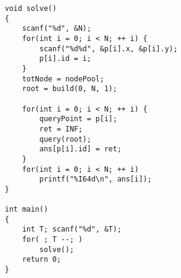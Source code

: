 \begin{lstlisting}
void solve()
{
    scanf("%d", &N);
    for(int i = 0; i < N; ++ i) {
        scanf("%d%d", &p[i].x, &p[i].y);
        p[i].id = i;
    }
    totNode = nodePool;
    root = build(0, N, 1);
    
    for(int i = 0; i < N; ++ i) {
        queryPoint = p[i];
        ret = INF;
        query(root);
        ans[p[i].id] = ret;
    }
    for(int i = 0; i < N; ++ i)
        printf("%I64d\n", ans[i]);
}

int main()
{
    int T; scanf("%d", &T);
    for( ; T --; )
        solve();
    return 0;
}
\end{lstlisting}